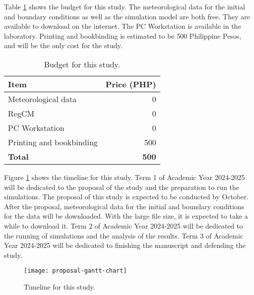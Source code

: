 Table \ref{tab:budget} shows the budget for this study.
The meteorological data for the initial and boundary conditions as well as the simulation model are both free.
They are available to download on the internet.
The PC Workstation is available in the laboratory.
Printing and bookbinding is estimated to be 500 Philippine Pesos,
and will be the only cost for the study.

\begin{table}
	\caption{Budget for this study.}
	\label{tab:budget}
	\centering
	\begin{tabular}{l r}
		\hline \hline
		Item & Price (PHP) \\
		\hline
		Meteorological data	& 0 \\
		RegCM & 0 \\
		PC Workstation & 0 \\
		Printing and bookbinding & 500 \\
		\hline
		\textbf{Total} & \textbf{500} \\
		\hline
	\end{tabular}
\end{table}

Figure \ref{fig:timeline} shows the timeline for this study.
Term 1 of Academic Year 2024-2025 will be dedicated to the proposal of the study and the preparation to run the simulations.
The proposal of this study is expected to be conducted by October.
After the proposal, meteorological data for the initial and boundary conditions for the data will be downloaded.
With the large file size, it is expected to take a while to download it.
Term 2 of Academic Year 2024-2025 will be dedicated to the running of simulations and the analysis of the results.
Term 3 of Academic Year 2024-2025 will be dedicated to finishing the manuscript and defending the study.

\begin{figure}
	\centering
	\texttt{[image: proposal-gantt-chart]}
	\caption{Timeline for this study.}
	\label{fig:timeline}
\end{figure}